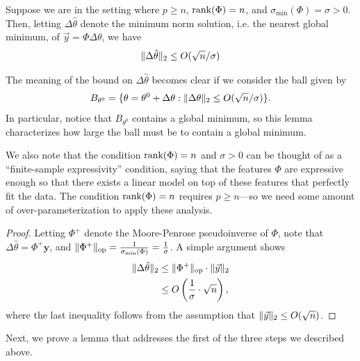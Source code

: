 \begin{lemma}[for (2)] \label{lec13:lma:nearest_minimum}
    Suppose we are in the setting where $p \geq n$, $\textup{rank}(\Phi) = n$, and $\sigma_{\min}(\Phi) = \sigma > 0$. Then, letting $\Delta \hat{\theta}$ denote the minimum norm solution, i.e. the nearest global minimum, of $\vec{y} = \Phi \Delta \theta$, we have 
    \begin{align} 
        \|\Delta \hat{\theta}\|_2 \leq O(\sqrt{n} / \sigma)
    \end{align} 
\end{lemma}
\begin{remark} \label{lec13:rmk:intuitiononlemma} 
    The meaning of the bound on $\Delta \hat{\theta}$ becomes clear if we consider the ball given by 
    \begin{align}
        B_{\theta^0} = \{ \theta = \theta^0 + \Delta \theta: \|\Delta \theta\|_2 \leq O(\sqrt{n}/\sigma )\}.
    \end{align} 
    In particular, notice that $B_{\theta^0}$ contains a global minimum, so this lemma characterizes how large the ball must be to contain a global minimum. 
    \end{remark} 
\begin{remark}
	We also note that the condition $\textup{rank}(\Phi) = n$ and $\sigma > 0$ can be thought of as a ``finite-sample expressivity'' condition, saying that the features $\Phi$ are expressive enough so that there exists a linear model on top of these features that perfectly fit the data. The condition $\textup{rank}(\Phi) = n$ requires $p \ge n$---so we need some amount of over-parameterization to apply these analysis. 
\end{remark}
\begin{proof}
    Letting $\Phi^+$ denote the Moore-Penrose pseudoinverse of $\Phi$, note that $\Delta \hat{\theta} = \Phi^+ \boldsymbol{y}$, and $\|\Phi^+\| _{\text{op}} = \frac{1}{\sigma_{\min} (\Phi)} = \frac{1}{\sigma}$.  A simple argument shows 
    \begin{align}
        \|\Delta \hat{\theta}\|_2 &\leq \|\Phi^+\|_{\text{op}} \cdot \|\vec{y}\|_2 \\
        &\leq O\left( \frac{1}{\sigma}\cdot \sqrt{n} \right),
    \end{align} 
    where the last inequality follows from the assumption that $\|\vec{y}\|_2 \leq O(\sqrt{n})$. 
\end{proof}
Next, we prove a lemma that addresses the first of the three steps we described above.
